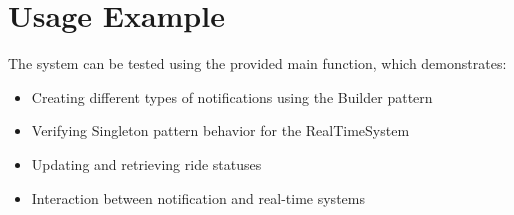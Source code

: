 \documentclass[12pt]{article}
\begin{document}
\section{Usage Example}
The system can be tested using the provided main function, which demonstrates:
\begin{itemize}
    \item Creating different types of notifications using the Builder pattern
    \item Verifying Singleton pattern behavior for the RealTimeSystem
    \item Updating and retrieving ride statuses
    \item Interaction between notification and real-time systems
\end{itemize}
\end{document}
